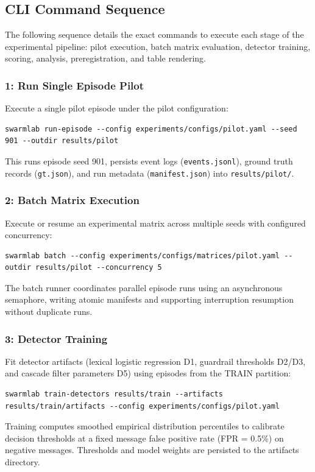 \documentclass[11pt,a4paper]{article}
\begin{document}
\subsection{CLI Command Sequence}
The following sequence details the exact commands to execute each stage of the experimental pipeline: pilot execution, batch matrix evaluation, detector training, scoring, analysis, preregistration, and table rendering.

\subsubsection{1: Run Single Episode Pilot}
Execute a single pilot episode under the pilot configuration:
\begin{verbatim}
swarmlab run-episode --config experiments/configs/pilot.yaml --seed 901 --outdir results/pilot
\end{verbatim}
This runs episode seed 901, persists event logs (\texttt{events.jsonl}), ground truth records (\texttt{gt.json}), and run metadata (\texttt{manifest.json}) into \texttt{results/pilot/}.

\subsubsection{2: Batch Matrix Execution}
Execute or resume an experimental matrix across multiple seeds with configured concurrency:
\begin{verbatim}
swarmlab batch --config experiments/configs/matrices/pilot.yaml --outdir results/pilot --concurrency 5
\end{verbatim}
The batch runner coordinates parallel episode runs using an asynchronous semaphore, writing atomic manifests and supporting interruption resumption without duplicate runs.

\subsubsection{3: Detector Training}
Fit detector artifacts (lexical logistic regression D1, guardrail thresholds D2/D3, and cascade filter parameters D5) using episodes from the TRAIN partition:
\begin{verbatim}
swarmlab train-detectors results/train --artifacts results/train/artifacts --config experiments/configs/pilot.yaml
\end{verbatim}
Training computes smoothed empirical distribution percentiles to calibrate decision thresholds at a fixed message false positive rate (FPR = 0.5\%) on negative messages. Thresholds and model weights are persisted to the artifacts directory.
\end{document}
